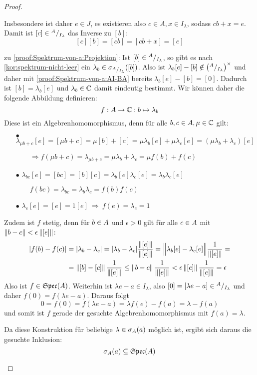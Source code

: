 \begin{proof}
\begin{itemize}
Insbesondere ist daher $e \in J$, es existieren also $c \in A, x \in I_\lambda$, sodass $cb + x = e$. Damit ist $[c] \in {}^A/_{I_\lambda}$ das Inverse zu $[b]$:
	\[[c][b] = [cb] = [cb + x] = [e]\]

zu \ref{proof:Spektrum-von-a:Projektion}:
Ist $[b] \in {}^A/_{I_\lambda}$, so gibt es nach \cref{kor:spektrum-nicht-leer} ein $\lambda_b \in \sigma_{^A/_{I_\lambda}}([b])$. Also ist $\lambda_b[e] - [b] \notin \left({}^A/_{I_\lambda}\right)^\times$ und daher mit \ref{proof:Spektrum-von-a:AI-BA} bereits $\lambda_b[e] - [b] = [0]$. Dadurch ist $[b] = \lambda_b[e]$ und $\lambda_b \in \mathbb{C}$ damit eindeutig bestimmt. Wir können daher die folgende Abbildung definieren:
	\[f: A \to \mathbb{C}: b \mapsto \lambda_b\]
Diese ist ein Algebrenhomomorphismus, denn für alle $b,c \in A, \mu \in \mathbb{C}$ gilt:
\begin{itemize}
	\item[$\bullet$] 
		$\lambda_{\mu b+c}[e] = [\mu b+c] = \mu[b]+[c] = \mu\lambda_b[e] + \mu\lambda_c[e] = (\mu\lambda_b +\lambda_c)[e]$
	
			$\qquad \Rightarrow f(\mu b + c) = \lambda_{\mu b+c} = \mu\lambda_b +\lambda_c  = \mu f(b) + f(c)$
	\item[$\bullet$]
		 $\lambda_{bc}[e] = [bc] = [b][c] = \lambda_b[e]\lambda_c[e] = \lambda_b\lambda_c[e]$
	
			$\qquad f(bc) = \lambda_{bc} = \lambda_b\lambda_c  = f(b)f(c)$
	\item[$\bullet$]
		 $\lambda_e[e] = [e] = 1[e] ~ \Rightarrow ~ f(e) = \lambda_e = 1$
\end{itemize}
Zudem ist $f$ stetig, denn für $b \in A$ und $\epsilon > 0$ gilt für alle $c \in A$ mit $\left\lVert b-c\right\rVert < \epsilon\left\lVert[e]\right\rVert$:
	\begin{align*}
		|f(b)-f(c)| &= |\lambda_b - \lambda_c| = |\lambda_b - \lambda_c|\frac{\left\lVert[e]\right\rVert}{\left\lVert[e]\right\rVert} = \Big\lVert\lambda_b[e] - \lambda_c[e]\Big\rVert\frac{1}{\left\lVert[e]\right\rVert}  = \\
					&= \left\lVert[b]-[c]\right\rVert\frac{1}{\left\lVert[e]\right\rVert} \leq \left\lVert b-c\right\rVert\frac{1}{\left\lVert[e]\right\rVert} < \epsilon\left\lVert[e]\right\rVert\frac{1}{\left\lVert[e]\right\rVert} = \epsilon
	\end{align*}	
Also ist $f \in \mathfrak{Spec}(A)$. Weiterhin ist $\lambda e - a \in I_\lambda$, also $[0] = [\lambda e - a] \in {}^A/_{I_\lambda}$ und daher $f(0) = f(\lambda e - a)$. Daraus folgt
	\[0 = f(0) = f(\lambda e - a) = \lambda f(e) - f(a) = \lambda - f(a)\]
und somit ist $f$ gerade der gesuchte Algebrenhomomorphismus mit $f(a) = \lambda$.

Da diese Konstruktion für beliebige $\lambda \in \sigma_A(a)$ möglich ist, ergibt sich daraus die gesuchte Inklusion:
	\[\sigma_A(a) \subseteq \mathfrak{Spec}(A)\]
\end{itemize}
\end{proof}


